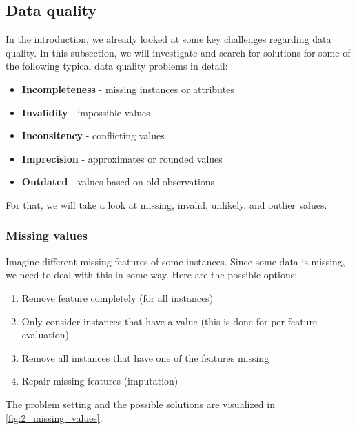 \subsection{Data quality}

In the introduction, we already looked at some key challenges regarding data quality. In this subsection, we will investigate and search for solutions for some of the following typical data quality problems in detail:
\begin{itemize}
  \item \textbf{Incompleteness} - missing instances or attributes
  \item \textbf{Invalidity} - impossible values
  \item \textbf{Inconsitency} - conflicting values
  \item \textbf{Imprecision} - approximates or rounded values
  \item \textbf{Outdated} - values based on old observations
\end{itemize}

For that, we will take a look at missing, invalid, unlikely, and outlier values.

\subsubsection*{Missing values}
Imagine different missing features of some instances. Since some data is missing, we need to deal with this in some way. Here are the possible options:
\begin{enumerate}
  \item Remove feature completely (for all instances)
  \item Only consider instances that have a value (this is done for per-feature-evaluation)
  \item Remove all instances that have one of the features missing
  \item Repair missing features (imputation)
\end{enumerate}

The problem setting and the possible solutions are visualized in \ref{fig:2_missing_values}.

